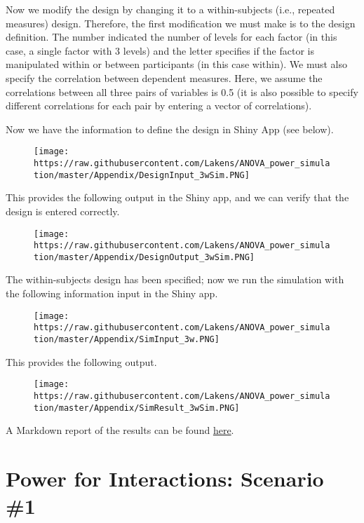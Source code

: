 \documentclass[]{article}
\begin{document}
Now we modify the design by changing it to a within-subjects (i.e.,
repeated measures) design. Therefore, the first modification we must
make is to the design definition. The number indicated the number of
levels for each factor (in this case, a single factor with 3 levels) and
the letter specifies if the factor is manipulated within or between
participants (in this case within). We must also specify the correlation
between dependent measures. Here, we assume the correlations between all
three pairs of variables is 0.5 (it is also possible to specify
different correlations for each pair by entering a vector of
correlations).

Now we have the information to define the design in Shiny App (see
below).

\begin{figure}
\centering
\texttt{[image: https://raw.githubusercontent.com/Lakens/ANOVA\_power\_simulation/master/Appendix/DesignInput\_3wSim.PNG]}
\caption{}
\end{figure}

This provides the following output in the Shiny app, and we can verify
that the design is entered correctly.

\begin{figure}
\centering
\texttt{[image: https://raw.githubusercontent.com/Lakens/ANOVA\_power\_simulation/master/Appendix/DesignOutput\_3wSim.PNG]}
\caption{}
\end{figure}

The within-subjects design has been specified; now we run the simulation
with the following information input in the Shiny app.

\begin{figure}
\centering
\texttt{[image: https://raw.githubusercontent.com/Lakens/ANOVA\_power\_simulation/master/Appendix/SimInput\_3w.PNG]}
\caption{}
\end{figure}

This provides the following output.

\begin{figure}
\centering
\texttt{[image: https://raw.githubusercontent.com/Lakens/ANOVA\_power\_simulation/master/Appendix/SimResult\_3wSim.PNG]}
\caption{}
\end{figure}

A Markdown report of the results can be found
\href{https://github.com/Lakens/ANOVA_power_simulation/blob/master/Appendix/Report_3wSim.pdf}{here}.

\section{Power for Interactions: Scenario
\#1}\label{power-for-interactions-scenario-1}
\end{document}
